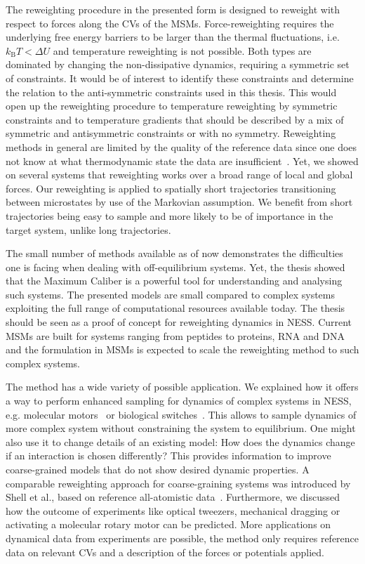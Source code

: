 The reweighting procedure in the presented form is designed to reweight with respect to forces along the CVs of the MSMs. Force-reweighting requires the underlying free energy barriers to be larger than the thermal fluctuations, i.e. $k_{\mathrm{B}} T < \Delta U$ and temperature reweighting is not possible.  Both types are  dominated by changing the non-dissipative dynamics, requiring a symmetric set of constraints. It would be of interest to identify these constraints and determine the relation to the anti-symmetric constraints used in this thesis. This would open up the reweighting procedure to temperature reweighting by symmetric constraints and to temperature gradients that should be described by a mix of symmetric and antisymmetric constraints or with no symmetry.  Reweighting methods in general are limited by the quality of the reference data since one does not know at what thermodynamic state the data are insufficient~\cite{warren2018trajectory}. Yet, we showed on several systems that reweighting works over a broad range of local and global forces. Our reweighting is applied to spatially short trajectories transitioning between microstates by use of the Markovian assumption. We benefit from short trajectories being easy to sample and more likely to be of importance in the target system, unlike long trajectories.

The small number of methods available as of now demonstrates the difficulties one is facing when dealing with off-equilibrium systems. Yet, the thesis showed that the Maximum Caliber is a powerful tool for understanding and analysing such systems. The presented models are small compared to complex systems exploiting the full range of computational resources available today. The thesis should be seen as a proof of concept for reweighting dynamics in NESS. Current MSMs are built for systems ranging from peptides to proteins, RNA and DNA~\cite{schutte2015critical} and the formulation in MSMs is expected to scale the reweighting method to such complex systems.
 
The method has a wide variety of possible application. We explained how it offers a way to perform enhanced sampling for dynamics of complex systems in NESS, e.g. molecular motors~\cite{schliwa2003molecular} or biological switches~\cite{goldbeter1997biochemical}. This allows to sample dynamics of more complex system without constraining the system to equilibrium. One might also use it to change details of an existing model: How does the dynamics change if an interaction is chosen differently? This provides information to improve coarse-grained models that do not show desired dynamic properties.  A comparable reweighting approach for coarse-graining systems was introduced by Shell et al., based on reference all-atomistic data~\cite{chaimovich2010relative}.  Furthermore, we discussed how the outcome of experiments like optical tweezers, mechanical dragging or activating a molecular rotary motor can be predicted. More applications on dynamical data from experiments are possible, the method only requires reference data on relevant CVs and a description of the forces or potentials applied. 
% 
%  
% 
% 
% 
